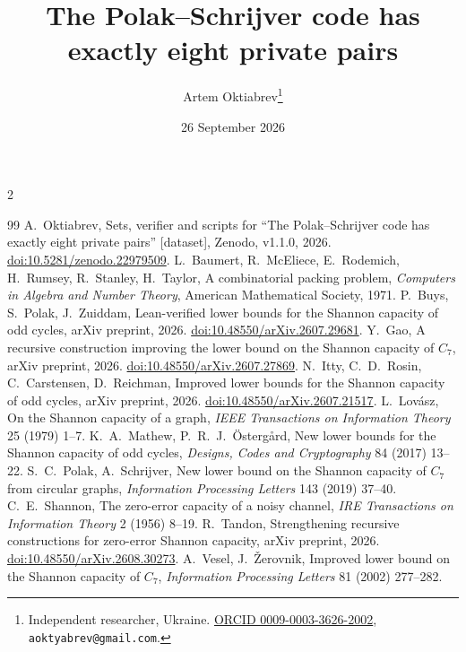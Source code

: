 \documentclass[11pt]{article}
\title{The Polak--Schrijver code has exactly eight private pairs}
\author{Artem Oktiabrev\thanks{Independent researcher, Ukraine.
\href{https://orcid.org/0009-0003-3626-2002}{ORCID 0009-0003-3626-2002},
\texttt{aoktyabrev@gmail.com}.}}
\date{26 September 2026}
\theoremstyle{definition}
\theoremstyle{remark}
\begin{document}
\maketitle

\begin{abstract}

\end{abstract}



\footnotesize
\begin{multicols}{2}
\begin{thebibliography}{99}
\setlength{\itemsep}{-1pt}
\setlength{\parsep}{0pt}
 A.~Oktiabrev, Sets, verifier and scripts for ``The Polak--Schrijver
code has exactly eight private pairs'' [dataset], Zenodo, v1.1.0, 2026.
\href{https://doi.org/10.5281/zenodo.22979509}{doi:10.5281/zenodo.22979509}.
 L.~Baumert, R.~McEliece, E.~Rodemich, H.~Rumsey, R.~Stanley, H.~Taylor,
A combinatorial packing problem, \textit{Computers in Algebra and Number Theory}, American
Mathematical Society, 1971.
 P.~Buys, S.~Polak, J.~Zuiddam, Lean-verified lower bounds for the Shannon
capacity of odd cycles, arXiv preprint, 2026. \href{https://doi.org/10.48550/arXiv.2607.29681}{doi:10.48550/arXiv.2607.29681}.
 Y.~Gao, A recursive construction improving the lower bound on the Shannon
capacity of $C_7$, arXiv preprint, 2026. \href{https://doi.org/10.48550/arXiv.2607.27869}{doi:10.48550/arXiv.2607.27869}.
 N.~Itty, C.~D.~Rosin, C.~Carstensen, D.~Reichman, Improved lower bounds
for the Shannon capacity of odd cycles, arXiv preprint, 2026. \href{https://doi.org/10.48550/arXiv.2607.21517}{doi:10.48550/arXiv.2607.21517}.
 L.~Lov\'asz, On the Shannon capacity of a graph, \textit{IEEE
Transactions on Information Theory} 25 (1979) 1--7.
 K.~A.~Mathew, P.~R.~J.~\"Osterg{\aa}rd, New lower bounds for the Shannon
capacity of odd cycles, \textit{Designs, Codes and Cryptography} 84 (2017) 13--22.
 S.~C.~Polak, A.~Schrijver, New lower bound on the Shannon capacity of
$C_7$ from circular graphs, \textit{Information Processing Letters} 143 (2019) 37--40.
 C.~E.~Shannon, The zero-error capacity of a noisy channel, \textit{IRE
Transactions on Information Theory} 2 (1956) 8--19.
 R.~Tandon, Strengthening recursive constructions for zero-error Shannon
capacity, arXiv preprint, 2026. \href{https://doi.org/10.48550/arXiv.2608.30273}{doi:10.48550/arXiv.2608.30273}.
 A.~Vesel, J.~\v{Z}erovnik, Improved lower bound on the Shannon capacity
of $C_7$, \textit{Information Processing Letters} 81 (2002) 277--282.
\end{thebibliography}
\end{multicols}
\end{document}
